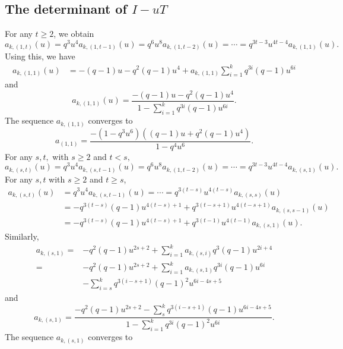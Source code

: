 \documentclass[11pt]{amsart}
\theoremstyle{definition}
\theoremstyle{remark}
\numberwithin{equation}{section}
\begin{document}
\subsection{The determinant of $I-uT$} For any $t\geq 2$, we obtain
$$a_{k,(1,t)}(u)=q^3u^4a_{k,(1,t-1)}(u)=q^6u^8a_{k,(1,t-2)}(u)=\cdots=q^{3t-3}u^{4t-4}a_{k,(1,1)}(u).$$
Using this, we have
\begin{equation*}
\begin{split}
a_{k,(1,1)}(u)%
&=-(q-1)u-q^2(q-1)u^4+a_{k,(1,1)}\sum_{i=1}^k q^{3i}(q-1)u^{6i}
\end{split}
\end{equation*}
and 
\begin{equation*}
a_{k,(1,1)}(u)=\frac{-(q-1)u-q^2(q-1)u^4}{1-\displaystyle\sum_{i=1}^kq^{3i}(q-1)u^{6i}}.
\end{equation*}
The sequence $a_{k,(1,1)}$ converges to
$$a_{(1,1)}=\frac{-(1-q^3u^6)((q-1)u+q^2(q-1)u^4)}{1-q^4u^6}.$$
For any $s,t,$ with $s\geq 2$ and $t< s,$
$$a_{k,(s,t)}(u)=q^3u^4a_{k,(s,t-1)}(u)=q^6u^8a_{k,(1,t-2)}(u)=\cdots=q^{3t-3}u^{4t-4}a_{k,(s,1)}(u).$$
For any $s,t$ with $s\geq 2$ and $t\geq s$,
\begin{equation*}
\begin{split}
a_{k,(s,t)}(u)&=q^3u^4a_{k,(s,t-1)}(u)=\cdots=q^{3(t-s)}u^{4(t-s)}a_{k,(s,s)}(u)\\
&=-q^{3(t-s)}(q-1)u^{4(t-s)+1}+q^{3(t-s+1)}u^{4(t-s+1)}a_{k,(s,s-1)}(u)\\
&=-q^{3(t-s)}(q-1)u^{4(t-s)+1}+q^{3(t-1)}u^{4(t-1)}a_{k,(s,1)}(u).
\end{split}
\end{equation*}
Similarly, 
\begin{equation*}
\begin{split}
a_{k,(s,1)}=&-q^{2}(q-1)u^{2s+2}+\displaystyle\sum_{i=1}^k a_{k,(s,i)}q^{3}(q-1)u^{2i+4}\\
=&-q^{2}(q-1)u^{2s+2}+\displaystyle\sum_{i=1}^k a_{k,(s,1)}q^{3i}(q-1)u^{6i}\\
&-\sum_{i=s}^kq^{3(i-s+1)}(q-1)^2u^{6i-4s+5}
\end{split}
\end{equation*}
and 
\begin{equation*}
a_{k,(s,1)}=\frac{-q^{2}(q-1)u^{2s+2}-\displaystyle\sum_{s}^kq^{3(i-s+1)}(q-1)u^{6i-4s+5}}{1-\displaystyle\sum_{i=1}^k q^{3i}(q-1)^2u^{6i}}.
\end{equation*}
The sequence $a_{k,(s,1)}$ converges to 
\end{document}
